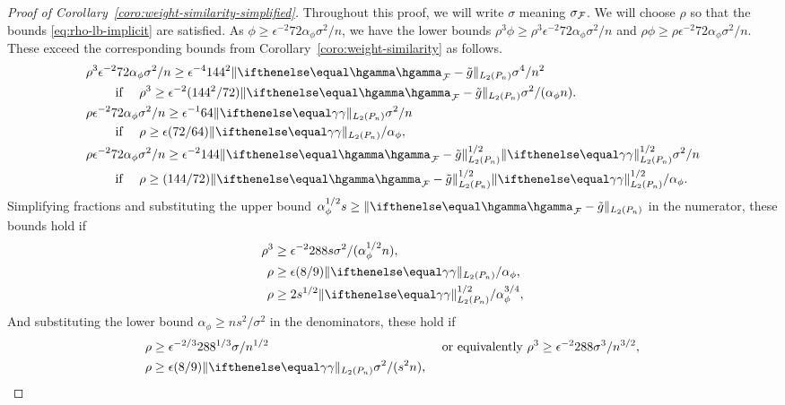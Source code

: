 \begin{proof}[Proof of Corollary~\ref{coro:weight-similarity-simplified}]
Throughout this proof, we will write $\sigma$ meaning $\sigma_{\mathcal{F}}$.
We will choose $\rho$ so that the bounds \eqref{eq:rho-lb-implicit} are satisfied.
As $\phi \ge \epsilon^{-2}72\alpha_\phi \sigma^2/n$,
we have the lower bounds $\rho^3 \phi \ge \rho^3 \epsilon^{-2}72\alpha_\phi \sigma^2/n$
and $\rho \phi \ge  \rho \epsilon^{-2}72\alpha_\phi \sigma^2/n$. 
These exceed the corresponding bounds
from Corollary~\ref{coro:weight-similarity} as follows. 
\begin{align*} 
&\rho^3 \epsilon^{-2}72\alpha_\phi \sigma^2/n \ge \epsilon^{-4} 144^2 \norm{\hriesz_{\F} - \gapprox}_{L_2(\Pn)} \sigma^4/n^2 \\
&\qquad \text{ if } \quad  \rho^3 \ge \epsilon^{-2} (144^2/72) \norm{\hriesz_{\F} - \tilde g}_{L_2(\Pn)}\sigma^2/(\alpha_\phi n). \\
&\rho \epsilon^{-2}72\alpha_\phi \sigma^2/n \ge \epsilon^{-1} 64 \norm{\riesz}_{L_2(\Pn)} \sigma^2/n \\
&\qquad \text{ if } \quad  \rho   \ge \epsilon (72/64) \norm{\riesz}_{L_2(\Pn)}/\alpha_\phi, \\
&\rho \epsilon^{-2}72\alpha_\phi \sigma^2/n \ge \epsilon^{-2} 144\norm{\hriesz_{\F} - \gapprox}_{L_2(\Pn)}^{1/2} \norm{\riesz}_{L_2(\Pn)}^{1/2} \sigma^2/n \\
&\qquad \text{ if } \quad \rho   \ge (144/72) \norm{\hriesz_{\F} - \gapprox}_{L_2(\Pn)}^{1/2}\norm{\riesz}_{L_2(\Pn)}^{1/2} /\alpha_\phi. 
\end{align*}
Simplifying fractions and substituting the upper bound $\alpha_\phi^{1/2}s \ge \norm{\hriesz_{\F} - \tilde g}_{L_2(\Pn)}$
in the numerator, these bounds hold if
\begin{align*} 
\rho^3 &\ge \epsilon^{-2} 288 s \sigma^2 / (\alpha_\phi^{1/2} n), \\
\rho   &\ge \epsilon (8/9) \norm{\riesz}_{L_2(\Pn)}/\alpha_\phi, \\
\rho   &\ge 2 s^{1/2} \norm{\riesz}_{L_2(\Pn)}^{1/2} /\alpha_\phi^{3/4}, \\
\end{align*} 
And substituting the lower bound $\alpha_\phi \ge n s^2 / \sigma^2$ in the denominators, these hold if
\begin{align*} 
\rho   &\ge \epsilon^{-2/3} 288^{1/3}  \sigma / n^{1/2} && \text{ or equivalently }  \rho^3 \ge \epsilon^{-2} 288  \sigma^3 / n^{3/2}, \\
\rho   &\ge \epsilon (8/9) \norm{\riesz}_{L_2(\Pn)} \sigma^2/(s^2 n), &&\\

\end{align*}
\end{proof}
